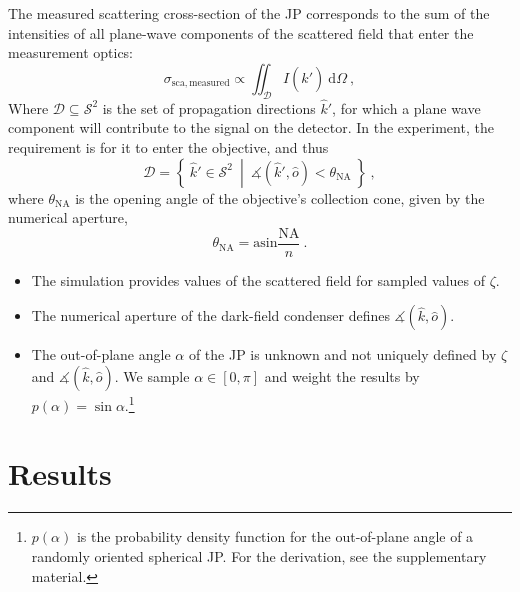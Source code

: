 \documentclass[10pt]{article}
\begin{document}
%


The measured scattering cross-section of the JP corresponds to the sum of the intensities of all plane-wave components of the scattered field that enter the measurement optics:
$$\sigma_\mathrm{sca,measured} \propto \iint_{\mathcal{D}} I\left( \hat{k}' \right) ~\mathrm{d}\Omega\ ,$$
Where $\mathcal{D} \subseteq \mathcal{S}^2$ is the set of propagation directions $\hat{k}'$, for which a plane wave component will contribute to the signal on the detector. 
In the experiment, the requirement is for it to enter the objective, and thus
$$
    \mathcal{D} = \left\lbrace\ \hat{k}' \in \mathcal{S}^2\ \middle\vert\ \measuredangle\!\left( \hat{k}', \hat{o}\right) < \theta_\mathrm{NA}\ \right\rbrace
    \ ,
$$
where $\theta_\mathrm{NA}$ is the opening angle of the objective's collection cone, given by the numerical aperture,
$$\theta_\mathrm{NA} = \mathrm{asin}\frac{\mathrm{NA}}{n} \ .$$

\begin{itemize}
    \item The simulation provides values of the scattered field for sampled values of $\zeta$.
    \item The numerical aperture of the dark-field condenser defines $\measuredangle(\hat{k},\hat{o})$.
    \item The out-of-plane angle $\alpha$ of the JP is unknown and not uniquely defined by $\zeta$ and $\measuredangle(\hat{k},\hat{o})$. We sample $\alpha\in\left[0,\pi\right]$ and weight the results by $p(\alpha) = \sin\alpha$.\footnote{$p(\alpha)$ is the probability density function for the out-of-plane angle of a randomly oriented spherical JP. For the derivation, see the supplementary material.}
\end{itemize}









\section*{Results}
\end{document}
